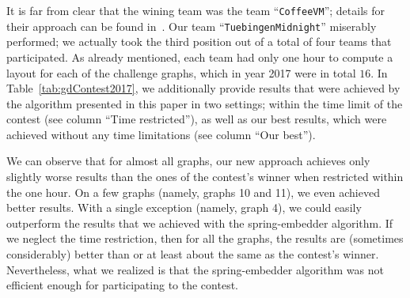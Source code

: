 \documentclass{comjnl}
\begin{document}
It is far from clear that the wining team was the team  ``\texttt{CoffeeVM}''; details for their approach can be found in~\cite{DBLP:journals/corr/abs-1807-09483}. Our team ``\texttt{TuebingenMidnight}''  miserably performed; we actually took the third position out of a total of four teams that participated. As already mentioned, each team had only one hour to compute a layout for each of the challenge graphs, which in year 2017 were in total $16$. In Table~\ref{tab:gdContest2017}, we additionally provide results that were achieved by the algorithm presented in this paper in two settings; within the time limit of the contest (see column ``Time restricted''), as well as our best results, which were achieved without any time limitations (see column ``Our best'').

We can observe that for almost all graphs, our new approach achieves only slightly worse results than the ones of the contest's winner when restricted within the one hour. On a few graphs (namely, graphs 10 and 11), we even achieved better results. With a single exception (namely, graph 4), we could easily outperform the results that we achieved with the spring-embedder algorithm. If we neglect the time restriction, then for all the graphs, the results are (sometimes considerably) better than or at least about the same as the contest's winner. Nevertheless, what we realized is that the spring-embedder algorithm was not efficient enough for participating to the contest.
\end{document}
